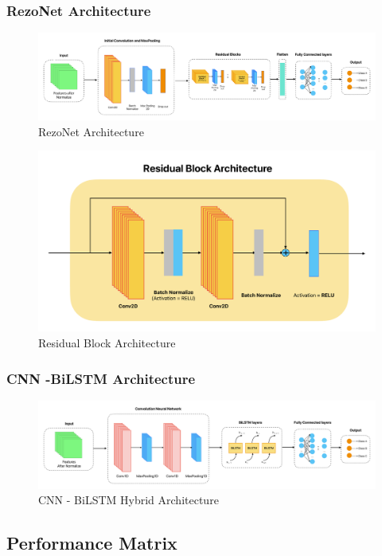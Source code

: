 \documentclass[conference, 10pt,onecolumn]{IEEEtran}
\begin{document}
\subsubsection{RezoNet Architecture}
\begin{figure}
    \centering
    \includegraphics[width=7 in]{RezoNet Architecture.pdf}
    \caption{RezoNet Architecture}
    \label{fig:RezoNet Architecture}
\end{figure}
\begin{figure}
    \centering
    \includegraphics[width=4 in]{Residual Block Architecture.pdf}
    \caption{Residual Block Architecture}
    \label{Residual Block Architecture}
\end{figure}
\subsubsection{CNN -BiLSTM Architecture}
\begin{figure}
    \centering
    \includegraphics[width=7 in]{CNN-BiLSTM architecture.pdf}
    \caption{CNN - BiLSTM Hybrid Architecture}
    \label{fig:CNN - BiLSTM Hybrid Architecture}
\end{figure}

\subsection{Performance Matrix}
\end{document}
